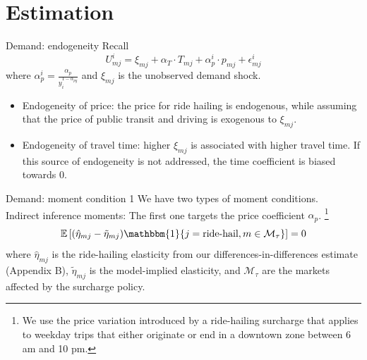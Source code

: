 \documentclass[10pt, aspectratio=169]{beamer}
\begin{document}
\section{Estimation}
\begin{frame}{Demand: endogeneity}
  Recall
  $$ U_{mj}^i = \xi_{mj} + \alpha_T \cdot T_{mj} + \alpha_p^i \cdot p_{mj} + \epsilon_{mj}^i $$
  where $\alpha_p^i = \frac{\alpha_p}{y_i^{1 - \alpha_{py}}}$ and $\xi_{mj} $ is the unobserved demand shock.
  \begin{itemize}
    \item Endogeneity of price: the price for ride hailing is endogenous, while assuming
          that the price of public transit and driving is exogenous to $\xi_{mj}$.
    \item Endogeneity of travel time: higher $\xi_{mj}$ is associated with higher travel
          time. If this source of endogeneity is not addressed, the time coefficient is
          biased towards 0.
  \end{itemize}
\end{frame}

\begin{frame}{Demand: moment condition 1}
  We have two types of moment conditions.\\
  \alert{Indirect inference moments}: The first one targets the price coefficient $\alpha_p$.
  \footnote{We use the price variation introduced by a ride-hailing
    surcharge that applies to weekday trips that either originate or end in a downtown zone between 6 am and 10 pm.}
  \begin{equation*}
    \mathbb{E} \left[ (\hat{\eta}_{mj} - \tilde{\eta}_{mj}) \mathbbm{1}\{ j = \text{ride-hail}, m \in \mathcal{M}_{\tau} \} \right] = 0
  \end{equation*} where \(\hat{\eta}_{mj}\) is the ride-hailing elasticity from our differences-in-differences estimate (Appendix B), \(\tilde{\eta}_{mj}\) is the model-implied elasticity, and \(\mathcal{M}_{\tau}\) are the markets affected by the surcharge policy.

\end{frame}
\end{document}
